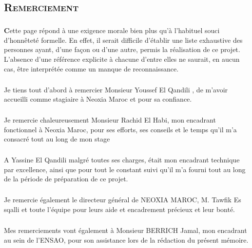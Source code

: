 \documentclass[a4paper, 12pt]{report}
\begin{document}
\begin{center}
\chapter*{\textsc{Remerciement}}

\paragraph{}
\textbf{C}ette page répond à une exigence morale bien plus qu'à l'habituel souci d'honnêteté formelle. En effet, il serait difficile d'établir une liste exhaustive des personnes ayant, d'une façon ou d'une autre, permis la réalisation de ce projet. L'absence d'une référence explicite à chacune d'entre elles ne saurait, en aucun cas, être interprétée comme un manque de reconnaissance. 
\paragraph{}
Je tiens tout d'abord à remercier Monsieur Youssef El Qandili , de m'avoir accueilli comme stagiaire à Neoxia Maroc et pour sa confiance. 
\paragraph{}
Je remercie chaleureusement Monsieur Rachid El Habi, mon encadrant fonctionnel à Neoxia Maroc, pour ses efforts, ses conseils et le temps qu'il m'a consacré tout au long de mon stage
\paragraph{}
A Yassine El Qandili malgré toutes ses charges, était mon encadrant  technique par excellence, ainsi que pour tout le constant suivi qu'il m'a fourni tout au long de la période de préparation de ce projet.
\paragraph{}
Je remercie également le directeur général de NEOXIA MAROC, M. Tawfik Es sqalli et toute l'équipe pour leurs aide et encadrement précieux et leur bonté.
\paragraph{}
Mes remerciements vont également à Monsieur BERRICH Jamal, mon encadrant au sein de l'ENSAO, pour son assistance lors de la rédaction du présent mémoire. 

\end{center}
\end{document}
